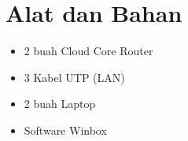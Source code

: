 \section*{Alat dan Bahan}
\indent
\begin{itemize}
    \item 2 buah Cloud Core Router
    \item 3 Kabel UTP (LAN)
    \item 2 buah Laptop
    \item Software Winbox
\end{itemize}